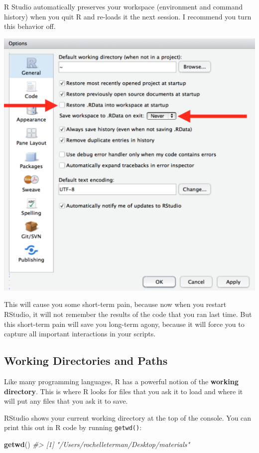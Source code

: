 \documentclass[]{book}
\newenvironment{Shaded}{\begin{snugshade}}{\end{snugshade}}
\newcommand{\KeywordTok}[1]{\textcolor[rgb]{0.13,0.29,0.53}{\textbf{#1}}}
\newcommand{\CommentTok}[1]{\textcolor[rgb]{0.56,0.35,0.01}{\textit{#1}}}
\newcommand{\NormalTok}[1]{#1}
\begin{document}
R Studio automatically preserves your workspace (environment and command
history) when you quit R and re-loads it the next session. I recommend
you turn this behavior off.

\begin{center}\includegraphics[width=0.7\linewidth]{img/rstudio-workspace} \end{center}

This will cause you some short-term pain, because now when you restart
RStudio, it will not remember the results of the code that you ran last
time. But this short-term pain will save you long-term agony, because it
will force you to capture all important interactions in your scripts.

\subsection{Working Directories and
Paths}\label{working-directories-and-paths}

Like many programming languages, R has a powerful notion of the
\textbf{working directory}. This is where R looks for files that you ask
it to load and where it will put any files that you ask it to save.

RStudio shows your current working directory at the top of the console.
You can print this out in R code by running \texttt{getwd()}:

\begin{Shaded}
\begin{Highlighting}[]
\KeywordTok{getwd}\NormalTok{()}
\CommentTok{#> [1] "/Users/rochelleterman/Desktop/materials"}
\end{Highlighting}
\end{Shaded}
\end{document}
